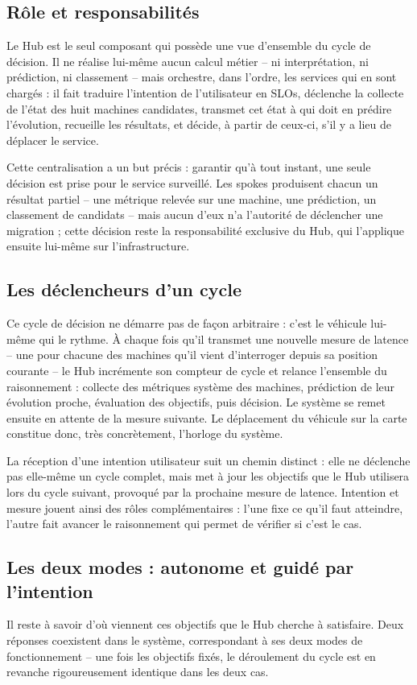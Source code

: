 \subsection{Rôle et responsabilités}
Le Hub est le seul composant qui possède une vue d'ensemble du cycle de décision. Il ne réalise lui-même aucun calcul métier -- ni interprétation, ni prédiction, ni classement -- mais orchestre, dans l'ordre, les services qui en sont chargés : il fait traduire l'intention de l'utilisateur en SLOs, déclenche la collecte de l'état des huit machines candidates, transmet cet état à qui doit en prédire l'évolution, recueille les résultats, et décide, à partir de ceux-ci, s'il y a lieu de déplacer le service.

Cette centralisation a un but précis : garantir qu'à tout instant, une seule décision est prise pour le service surveillé. Les spokes produisent chacun un résultat partiel -- une métrique relevée sur une machine, une prédiction, un classement de candidats -- mais aucun d'eux n'a l'autorité de déclencher une migration ; cette décision reste la responsabilité exclusive du Hub, qui l'applique ensuite lui-même sur l'infrastructure.

\subsection{Les déclencheurs d'un cycle}
Ce cycle de décision ne démarre pas de façon arbitraire : c'est le véhicule lui-même qui le rythme. À chaque fois qu'il transmet une nouvelle mesure de latence -- une pour chacune des machines qu'il vient d'interroger depuis sa position courante -- le Hub incrémente son compteur de cycle et relance l'ensemble du raisonnement : collecte des métriques système des machines, prédiction de leur évolution proche, évaluation des objectifs, puis décision. Le système se remet ensuite en attente de la mesure suivante. Le déplacement du véhicule sur la carte constitue donc, très concrètement, l'horloge du système.

La réception d'une intention utilisateur suit un chemin distinct : elle ne déclenche pas elle-même un cycle complet, mais met à jour les objectifs que le Hub utilisera lors du cycle suivant, provoqué par la prochaine mesure de latence. Intention et mesure jouent ainsi des rôles complémentaires : l'une fixe ce qu'il faut atteindre, l'autre fait avancer le raisonnement qui permet de vérifier si c'est le cas.

\subsection{Les deux modes : autonome et guidé par l'intention}
Il reste à savoir d'où viennent ces objectifs que le Hub cherche à satisfaire. Deux réponses coexistent dans le système, correspondant à ses deux modes de fonctionnement -- une fois les objectifs fixés, le déroulement du cycle est en revanche rigoureusement identique dans les deux cas.

